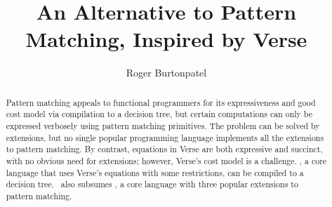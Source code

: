\documentclass[manuscript,screen,review, 12pt, nonacm]{acmart}
\begin{document}
\title{An Alternative to Pattern Matching, Inspired by Verse}

\author{Roger Burtonpatel}



\renewcommand{\shortauthors}{Burtonpatel et al.}

\begin{abstract}
Pattern matching appeals to functional programmers for its expressiveness and
good cost model via compilation to a decision tree, but certain computations can
only be expressed verbosely using pattern matching primitives. The problem
can be solved by extensions, but no single popular programming language
implements all the extensions to pattern matching. By contrast, equations in
Verse are both expressive and succinct, with no obvious need for extensions;
however, Verse's cost model is a challenge. \VMinus, a core language that uses
Verse's equations with some restrictions, can be compiled to a decision tree.
\VMinus\ also subsumes \PPlus, a core language with three popular extensions to
pattern matching. 
\end{abstract}


\maketitle
    







\end{document}
